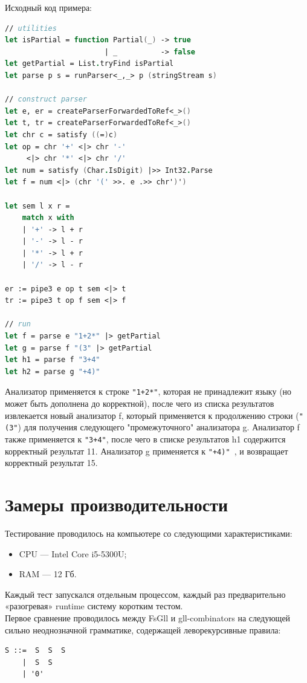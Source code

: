 \documentclass[14pt]{matmex-diploma}
\begin{document}
Исходный код примера:
\begin{lstlisting}[language=FSharp]
// utilities
let isPartial = function Partial(_) -> true 
                       | _          -> false
let getPartial = List.tryFind isPartial
let parse p s = runParser<_,_> p (stringStream s)

// construct parser
let e, er = createParserForwardedToRef<_>()
let t, tr = createParserForwardedToRef<_>()
let chr c = satisfy ((=)c) 
let op = chr '+' <|> chr '-' 
     <|> chr '*' <|> chr '/'
let num = satisfy (Char.IsDigit) |>> Int32.Parse
let f = num <|> (chr '(' >>. e .>> chr')')

let sem l x r = 
    match x with 
    | '+' -> l + r 
    | '-' -> l - r
    | '*' -> l + r 
    | '/' -> l - r
    
er := pipe3 e op t sem <|> t
tr := pipe3 t op f sem <|> f

// run
let f = parse e "1+2*" |> getPartial 
let g = parse f "(3" |> getPartial
let h1 = parse f "3+4"
let h2 = parse g "+4)"
\end{lstlisting}

Анализатор применяется к строке {\tt "1+2*"}, которая не принадлежит языку 
  (но может быть дополнена до корректной), после чего из списка результатов 
  извлекается новый анализатор f, который применяется к продолжению строки 
  ({\tt "(3"}) для получения следующего "промежуточного" анализатора g. Анализатор f также
  применяется к {\tt "3+4"}, после чего в списке результатов h1 содержится корректный
  результат 11. Анализатор g применяется к {\tt "+4)" }, и возвращает корректный результат 15.






\section{Замеры производительности}

Тестирование проводилось на компьютере со следующими характеристиками:
\begin{itemize}
    \item CPU --- Intel Core i5-5300U;
    \item RAM --- 12 Гб.
\end{itemize}
Каждый тест запускался отдельным процессом, каждый раз предварительно «разогревая» runtime 
систему коротким тестом.\\

Первое сравнение проводилось между FsGll и gll-combinators на следующей 
сильно неоднозначной грамматике, содержащей леворекурсивные правила: 
\begin{lstlisting}
S ::=  S  S  S 
    |  S  S 
    | '0'
\end{lstlisting}
\end{document}
